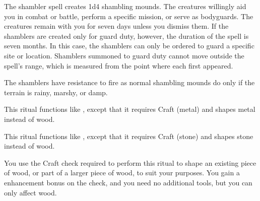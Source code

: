 \spellrng{\rngmed}
\begin{spelleffect}
The shambler spell creates 1d4 shambling mounds. The creatures willingly aid you in combat or battle, perform a specific mission, or serve as bodyguards. The creatures remain with you for seven days unless you dismiss them. If the shamblers are created only for guard duty, however, the duration of the spell is seven months. In this case, the shamblers can only be ordered to guard a specific site or location. Shamblers summoned to guard duty cannot move outside the spell's range, which is measured from the point where each first appeared. 
\par The shamblers have resistance to fire as normal shambling mounds do only if the terrain is rainy, marshy, or damp.
\end{spelleffect}

\begin{spelleffect}
    This ritual functions like , except that it requires Craft (metal) and shapes metal instead of wood. 
\end{spelleffect}

\begin{spelleffect}
    This ritual functions like , except that it requires Craft (stone) and shapes stone instead of wood.
\end{spelleffect}

\begin{spelleffect}
    You use the Craft check required to perform this ritual to shape an existing piece of wood, or part of a larger piece of wood, to suit your purposes. You gain a  enhancement bonus on the check, and you need no additional tools, but you can only affect wood.
\end{spelleffect}

